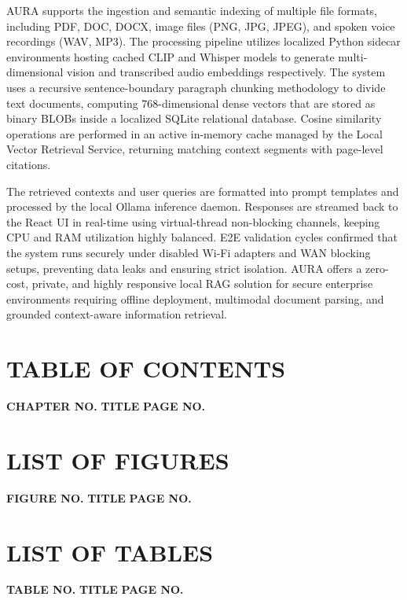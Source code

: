 \documentclass[12pt,a4paper]{report}
\makeatletter
\renewcommand{\contentsname}{TABLE OF CONTENTS}
\renewcommand{\listfigurename}{LIST OF FIGURES}
\renewcommand{\listtablename}{LIST OF TABLES}
\renewcommand\tableofcontents{%
    \chapter*{\contentsname}%
    \vspace{0.6cm}
    \noindent\textbf{CHAPTER NO.} \hfill \textbf{TITLE} \hfill \textbf{PAGE NO.} \\[0.3cm]
    \@starttoc{toc}%
}
\renewcommand\listoffigures{%
    \chapter*{\listfigurename}%
    \vspace{0.6cm}
    \noindent\textbf{FIGURE NO.} \hfill \textbf{TITLE} \hfill \textbf{PAGE NO.} \\[0.3cm]
    \@starttoc{lof}%
}
\renewcommand\listoftables{%
    \chapter*{\listtablename}%
    \vspace{0.6cm}
    \noindent\textbf{TABLE NO.} \hfill \textbf{TITLE} \hfill \textbf{PAGE NO.} \\[0.3cm]
    \@starttoc{lot}%
}
\makeatother
\begin{document}
AURA supports the ingestion and semantic indexing of multiple file formats, including PDF, DOC, DOCX, image files (PNG, JPG, JPEG), and spoken voice recordings (WAV, MP3). The processing pipeline utilizes localized Python sidecar environments hosting cached CLIP and Whisper models to generate multi-dimensional vision and transcribed audio embeddings respectively. The system uses a recursive sentence-boundary paragraph chunking methodology to divide text documents, computing 768-dimensional dense vectors that are stored as binary BLOBs inside a localized SQLite relational database. Cosine similarity operations are performed in an active in-memory cache managed by the Local Vector Retrieval Service, returning matching context segments with page-level citations.

The retrieved contexts and user queries are formatted into prompt templates and processed by the local Ollama inference daemon. Responses are streamed back to the React UI in real-time using virtual-thread non-blocking channels, keeping CPU and RAM utilization highly balanced. E2E validation cycles confirmed that the system runs securely under disabled Wi-Fi adapters and WAN blocking setups, preventing data leaks and ensuring strict isolation. AURA offers a zero-cost, private, and highly responsive local RAG solution for secure enterprise environments requiring offline deployment, multimodal document parsing, and grounded context-aware information retrieval.

\clearpage

\tableofcontents

\clearpage
{}
{}
\listoffigures

\clearpage
{}
{}
\listoftables


\clearpage
\end{document}
